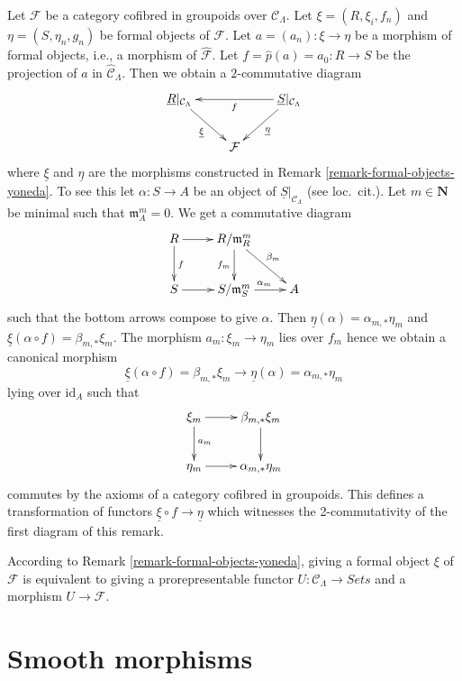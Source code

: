 \begin{remark}
\label{remark-formal-objects-yoneda-map}
Let $\mathcal{F}$ be a category cofibred in groupoids over
$\mathcal{C}_\Lambda$. Let $\xi = (R, \xi_i, f_n)$ and
$\eta = (S, \eta_n, g_n)$ be formal objects of $\mathcal{F}$.
Let $a = (a_n) : \xi \to \eta$ be a morphism of formal objects, i.e.,
a morphism of $\widehat{\mathcal{F}}$. Let
$f = \widehat{p}(a) = a_0 : R \to S$ be the projection of $a$ in
$\widehat{\mathcal{C}}_\Lambda$. Then we obtain a $2$-commutative
diagram
$$
\xymatrix{
\underline{R}|_{\mathcal{C}_\Lambda} \ar[rd]_{\underline{\xi}} & &
\underline{S}|_{\mathcal{C}_\Lambda} \ar[ll]^f \ar[ld]^{\underline{\eta}} \\
& \mathcal{F}
}
$$
where $\underline{\xi}$ and $\underline{\eta}$ are the morphisms
constructed in
Remark \ref{remark-formal-objects-yoneda}.
To see this let $\alpha : S \to A$ be an object of
$\underline{S}|_{\mathcal{C}_\Lambda}$ (see loc.\ cit.).
Let $m \in \mathbf{N}$ be minimal such that $\mathfrak m_A^m = 0$.
We get a commutative diagram
$$
\xymatrix{
R \ar[d]^f \ar[r] & R/\mathfrak m_R^m \ar[d]_{f_m} \ar[rd]^{\beta_m} \\
S \ar[r] & S/\mathfrak m_S^m \ar[r]^{\alpha_m} & A
}
$$
such that the bottom arrows compose to give $\alpha$.
Then $\underline{\eta}(\alpha) = \alpha_{m, *}\eta_m$ and
$\underline{\xi}(\alpha \circ f) = \beta_{m, *}\xi_m$. The morphism
$a_m : \xi_m \to \eta_m$ lies over $f_m$ hence we obtain a canonical
morphism
$$
\underline{\xi}(\alpha \circ f) = \beta_{m, *}\xi_m
\longrightarrow
\underline{\eta}(\alpha) = \alpha_{m, *}\eta_m
$$
lying over $\text{id}_A$ such that
$$
\xymatrix{
\xi_m \ar[r] \ar[d]^{a_m} &  \beta_{m, *}\xi_m \ar[d] \\
\eta_m \ar[r] &  \alpha_{m, *}\eta_m
}
$$
commutes by the axioms of a category cofibred in groupoids. This defines
a transformation of functors $\underline{\xi} \circ f \to \underline{\eta}$
which witnesses the 2-commutativity of the first diagram of this remark.
\end{remark}

\begin{remark}
\label{remark-spell-out-formal-object}
According to Remark \ref{remark-formal-objects-yoneda}, giving a formal object 
$\xi$ of $\mathcal{F}$ is equivalent to giving a prorepresentable functor
$U : \mathcal{C}_\Lambda \to \textit{Sets}$ and a morphism
$U \to \mathcal{F}$. 
\end{remark}




\section{Smooth morphisms}
\label{section-smooth-morphisms}

